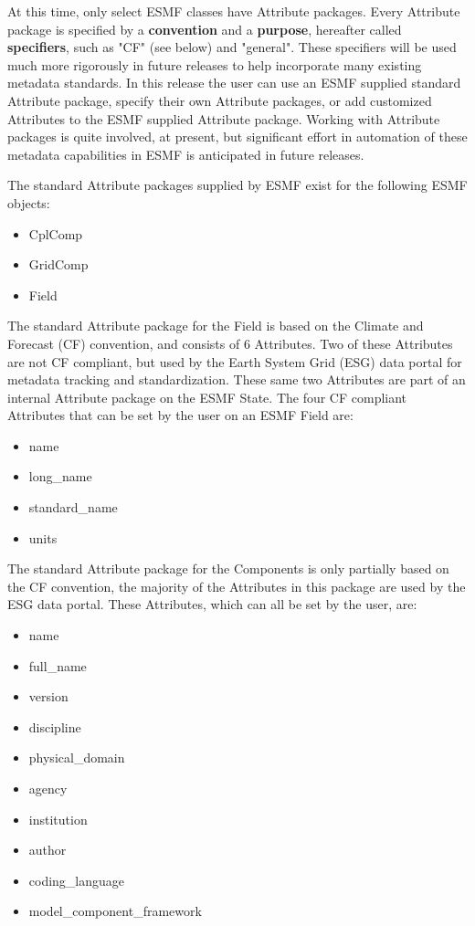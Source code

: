 At this time, only select ESMF classes have Attribute packages.  Every Attribute package is specified by a {\bf convention} and a {\bf purpose}, hereafter called {\bf specifiers}, such as "CF" (see below) and "general".  These specifiers will be used much more rigorously in future releases to help incorporate many existing metadata standards.  In this release the user can use an ESMF supplied standard Attribute package, specify their own Attribute packages, or add customized Attributes to the ESMF supplied Attribute package.  Working with Attribute packages is quite involved, at present, but significant effort in automation of these metadata capabilities in ESMF is anticipated in future releases. 

The standard Attribute packages supplied by ESMF exist for the following ESMF objects:

\begin{itemize}
\item CplComp
\item GridComp
\item Field
\end{itemize}

The standard Attribute package for the Field is based on the Climate and Forecast (CF) convention, and consists of 6 Attributes.  Two of these Attributes are not CF compliant, but used by the Earth System Grid (ESG) data portal for metadata tracking and standardization.  These same two Attributes are part of an internal Attribute package on the ESMF State.  The four CF compliant Attributes that can be set by the user on an ESMF Field are:

\begin{itemize}
\item name
\item long\_name
\item standard\_name
\item units
\end{itemize}

The standard Attribute package for the Components is only partially based on the CF convention, the majority of the Attributes in this package are used by the ESG data portal.  These Attributes, which can all be set by the user, are:

\begin{itemize}
\item name
\item full\_name
\item version
\item discipline
\item physical\_domain
\item agency
\item institution
\item author
\item coding\_language
\item model\_component\_framework
\end{itemize}










